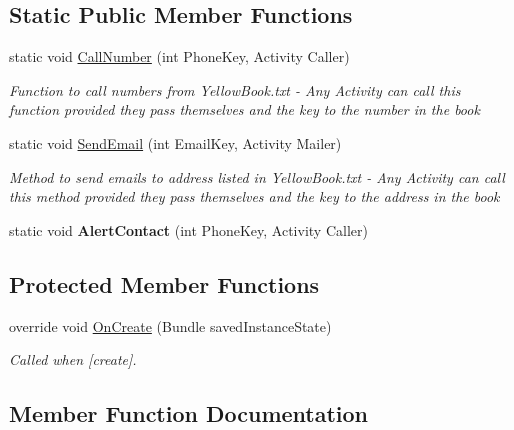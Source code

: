 \subsection*{Static Public Member Functions}
\begin{DoxyCompactItemize}
\item 
static void \hyperlink{class_w_c_c_mobile_1_1_phone_book_activity_a63c39ac58aa08c05cf2cd13e3682ad1f}{Call\+Number} (int Phone\+Key, Activity Caller)
\begin{DoxyCompactList}\small\item\em Function to call numbers from Yellow\+Book.\+txt -\/ Any Activity can call this function provided they pass themselves and the key to the number in the book \end{DoxyCompactList}\item 
static void \hyperlink{class_w_c_c_mobile_1_1_phone_book_activity_a2c0579d4f7de69f1420e3f74dad3ca1f}{Send\+Email} (int Email\+Key, Activity Mailer)
\begin{DoxyCompactList}\small\item\em Method to send emails to address listed in Yellow\+Book.\+txt -\/ Any Activity can call this method provided they pass themselves and the key to the address in the book \end{DoxyCompactList}\item 
static void {\bfseries Alert\+Contact} (int Phone\+Key, Activity Caller)\hypertarget{class_w_c_c_mobile_1_1_phone_book_activity_a1108a3cef14abccc2d96a0b4c05dfe8f}{}\label{class_w_c_c_mobile_1_1_phone_book_activity_a1108a3cef14abccc2d96a0b4c05dfe8f}

\end{DoxyCompactItemize}
\subsection*{Protected Member Functions}
\begin{DoxyCompactItemize}
\item 
override void \hyperlink{class_w_c_c_mobile_1_1_phone_book_activity_a0ce7032ff9764895b2bc66286f24a005}{On\+Create} (Bundle saved\+Instance\+State)
\begin{DoxyCompactList}\small\item\em Called when \mbox{[}create\mbox{]}. \end{DoxyCompactList}\end{DoxyCompactItemize}


\subsection{Member Function Documentation}
